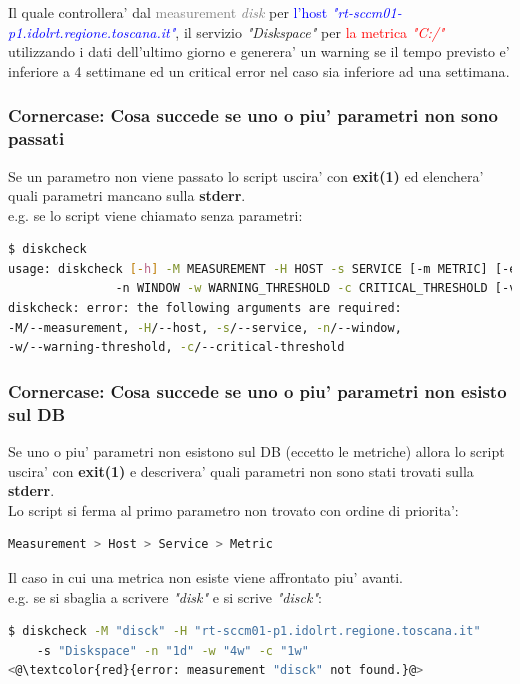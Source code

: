 \documentclass{article}
\begin{document}
Il quale controllera' dal \textcolor{gray}{measurement \textit{disk}} per \textcolor{blue}{l'host \textit{"rt-sccm01-p1.idolrt.regione.toscana.it"}}, \textcolor{green!10!orange!90!}{il servizio \textit{"Diskspace"}} per  \textcolor{red}{la metrica \textit{"C:/"}} utilizzando \textcolor{green!20!blue!80!}{i dati dell'ultimo giorno} e generera' un \textcolor{black!30!green!70!}{warning se il tempo previsto e'  inferiore a 4 settimane} \textcolor{black!30!magenta!70!}{ed un critical error nel caso sia inferiore ad una settimana}.

\clearpage

\subsubsection*{Cornercase: Cosa succede se uno o piu' parametri non sono passati}
Se un parametro non viene passato lo script uscira' con \textbf{exit(1)} ed elenchera' quali parametri mancano sulla \textbf{stderr}.
\\
e.g. se lo script viene chiamato senza parametri:
\begin{lstlisting}[language=Bash]
$ diskcheck
usage: diskcheck [-h] -M MEASUREMENT -H HOST -s SERVICE [-m METRIC] [-e EXCLUDE]
               -n WINDOW -w WARNING_THRESHOLD -c CRITICAL_THRESHOLD [-v {0,1}]
diskcheck: error: the following arguments are required:
-M/--measurement, -H/--host, -s/--service, -n/--window,
-w/--warning-threshold, -c/--critical-threshold
\end{lstlisting}

\subsubsection*{Cornercase: Cosa succede se uno o piu' parametri non esisto sul DB}
Se uno o piu' parametri non esistono sul DB (eccetto le metriche) allora lo script uscira' con \textbf{exit(1)} e descrivera' quali parametri non sono stati trovati sulla \textbf{stderr}.
\\
Lo script si ferma al primo parametro non trovato con ordine di priorita':
\begin{lstlisting}[language=Bash]
Measurement > Host > Service > Metric
\end{lstlisting}
Il caso in cui una metrica non esiste viene affrontato piu' avanti.\\
e.g. se si sbaglia a scrivere \textit{"disk"} e si scrive \textit{"disck"}:
\begin{lstlisting}[language=Bash]
$ diskcheck -M "disck" -H "rt-sccm01-p1.idolrt.regione.toscana.it" 
    -s "Diskspace" -n "1d" -w "4w" -c "1w"
<@\textcolor{red}{error: measurement "disck" not found.}@>
\end{lstlisting}
\end{document}
